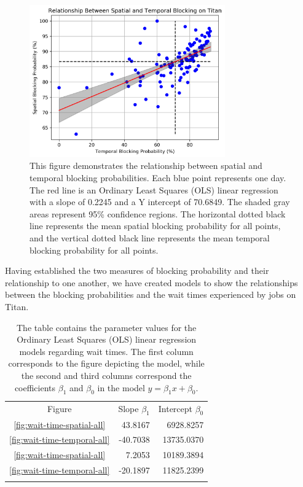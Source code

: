 \begin{figure}
  \includegraphics[width=0.75\textwidth]{images/linfit-spatial-vs-temporal-by-day.png}
\caption{This figure demonstrates the relationship between spatial and temporal
blocking probabilities. Each blue point represents one day. The red line is an
Ordinary Least Squares (OLS) linear regression with a slope of 0.2245 and a Y
intercept of 70.6849. The shaded gray areas represent 95\% confidence regions.
The horizontal dotted black line represents the mean spatial blocking
probability for all points, and the vertical dotted black line represents the
mean temporal blocking probability for all points.}
\label{fig:spatial-vs-temporal}
\end{figure}


Having established the two measures of blocking probability and their
relationship to one another, we have created models to show the relationships
between the blocking probabilities and the wait times experienced by jobs on
Titan.

\begin{table}
\caption{The table contains the parameter values for the Ordinary Least Squares
(OLS) linear regression models regarding wait times. The first column
corresponds to the figure depicting the model, while the second and third
columns correspond the coefficients $\beta_1$ and $\beta_0$ in the model
$y = \beta_{1}x + \beta_0$.}
\label{tab:wait-time-params}       %
\begin{tabular}{crr}
\hline\noalign{\smallskip}
Figure  & Slope $\beta_1$ & Intercept $\beta_0$  \\
\noalign{\smallskip}\hline\noalign{\smallskip}
\ref{fig:wait-time-spatial-all}     &    43.8167    &    6928.8257  \\
\ref{fig:wait-time-temporal-all}    &   -40.7038    &   13735.0370  \\
\ref{fig:wait-time-spatial-all}     &     7.2053    &   10189.3894  \\
\ref{fig:wait-time-temporal-all}    &   -20.1897    &   11825.2399  \\
\noalign{\smallskip}\hline
\end{tabular}
\end{table}


